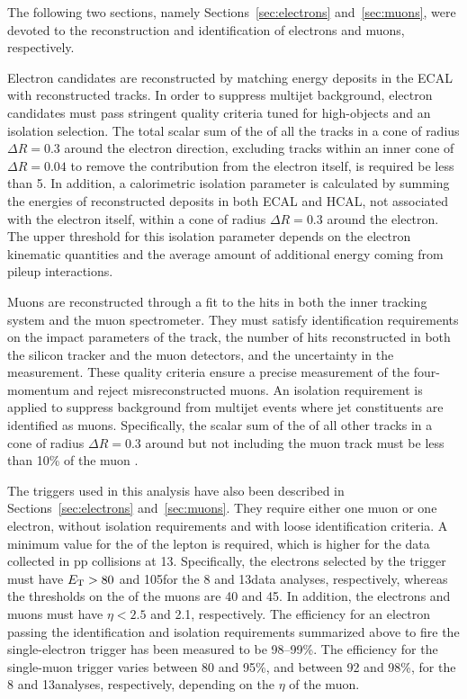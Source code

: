The following two sections, namely Sections~\ref{sec:electrons} and~\ref{sec:muons}, were devoted to the reconstruction and identification of electrons and muons, respectively.

Electron candidates are reconstructed by matching energy deposits in the ECAL with reconstructed tracks. In order to suppress multijet background, electron candidates must pass stringent quality criteria tuned for high-\pt objects and an isolation selection. The total scalar sum of the \pt of all the tracks in a cone of radius $\Delta R = 0.3$ around the electron direction, excluding tracks within an inner cone of $\Delta R = 0.04$ to remove the contribution from the electron itself, is required be less than 5\GeV. In addition, a calorimetric isolation parameter is calculated by summing the energies of reconstructed deposits in both ECAL and HCAL, not associated with the electron itself, within a cone of radius $\Delta R = 0.3$ around the electron. The upper threshold for this isolation parameter depends on the electron kinematic quantities and the average amount of additional energy coming from pileup interactions.

Muons are reconstructed through a fit to the hits in both the inner tracking system and the muon spectrometer.
They must satisfy identification requirements on the impact parameters of the track, the number of hits reconstructed in both the silicon tracker and the muon detectors, and the uncertainty in the \pt measurement.
These quality criteria ensure a precise measurement of the four-momentum and reject misreconstructed muons.
An isolation requirement is applied to suppress background from multijet events where jet constituents are identified as muons.
Specifically, the scalar sum of the \pt of all other tracks in a cone of radius $\Delta R = 0.3$ around but not including the muon track must be less than 10\% of the muon \pt.

The triggers used in this analysis have also been described in Sections~\ref{sec:electrons} and~\ref{sec:muons}. They require either one muon or one electron, without isolation requirements and with loose identification criteria.
A minimum value for the \pt of the lepton is required, which is higher for the data collected in pp collisions at 13\TeV.
Specifically, the electrons selected by the trigger must have $E_{\mathrm{T}} > 80$ and 105\GeV for the 8 and 13\TeV data analyses, respectively,
whereas the thresholds on the \pt of the muons are 40 and 45\GeV. In addition, the electrons and muons must have $\eta < 2.5$ and 2.1, respectively.
The efficiency for an electron passing the identification and isolation requirements summarized above to fire the single-electron trigger has been measured to be 98--99\%.
The efficiency for the single-muon trigger varies between 80 and 95\%, and between 92 and 98\%, for the 8 and 13\TeV analyses, respectively, depending on the $\eta$ of the muon.\\

